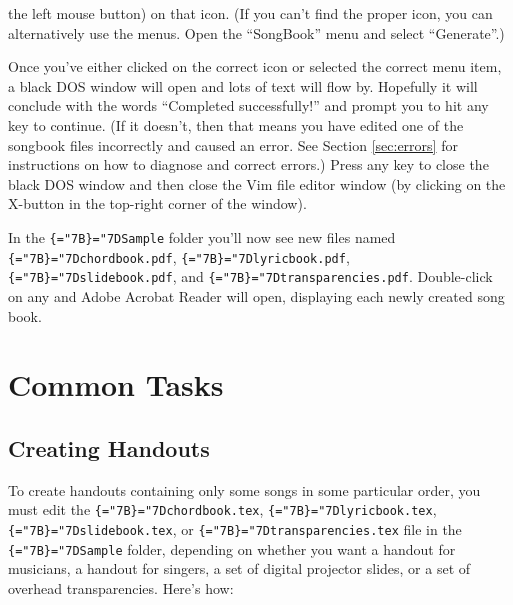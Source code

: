 \documentclass[12pt,oneside,letterpaper]{article}
\newcommand{\mytt}{\tt\chardef\{="7B\chardef\}="7D\relax}
\newcommand{\ppath}[1]{{\mytt#1}}
\begin{document}
\noindent
the left mouse button) on that icon.
(If you can't find the proper icon, you can alternatively use the menus.
Open the ``SongBook'' menu and select ``Generate''.)

Once you've either clicked on the correct icon or selected the correct menu
item, a black DOS window will open and lots of text will flow by.
Hopefully it will conclude with the words ``Completed successfully!'' and
prompt you to hit any key to continue.
(If it doesn't, then that means you have edited one of the songbook files
incorrectly and caused an error.
See Section \ref{sec:errors} for instructions on how to diagnose and correct
errors.)
Press any key to close the black DOS window and then close the Vim file editor
window (by clicking on the X-button in the top-right corner of the window).

In the \ppath{Sample} folder you'll now see new files named
\ppath{chordbook.pdf}, \ppath{lyricbook.pdf}, \ppath{slidebook.pdf}, and
\ppath{transparencies.pdf}.
Double-click on any and Adobe Acrobat Reader will open, displaying each newly
created song book.

\section{Common Tasks}\label{sec:common}

\subsection{Creating Handouts}

To create handouts containing only some songs in some particular order, you
must edit the \ppath{chordbook.tex}, \ppath{lyricbook.tex},
\ppath{slidebook.tex}, or \ppath{transparencies.tex} file in the
\ppath{Sample} folder, depending on whether you want a handout for musicians,
a handout for singers, a set of digital projector slides, or a set of
overhead transparencies.
Here's how:
\end{document}
